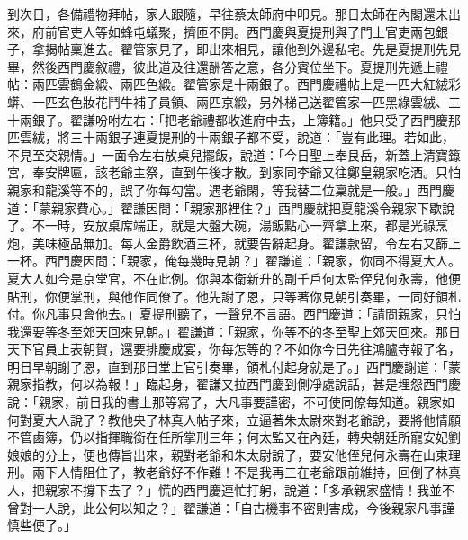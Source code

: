 到次日，各備禮物拜帖，家人跟隨，早往蔡太師府中叩見。那日太師在內閣還未出來，府前官吏人等如蜂屯蟻聚，擠匝不開。西門慶與夏提刑與了門上官吏兩包銀子，拿揭帖稟進去。翟管家見了，即出來相見，讓他到外邊私宅。先是夏提刑先見畢，然後西門慶敘禮，彼此道及往還酬答之意，各分賓位坐下。夏提刑先遞上禮帖：兩匹雲鶴金緞、兩匹色緞。翟管家是十兩銀子。西門慶禮帖上是一匹大紅絨彩蟒、一匹玄色妝花鬥牛補子員領、兩匹京緞，另外梯己送翟管家一匹黑綠雲絨、三十兩銀子。翟謙吩咐左右：「把老爺禮都收進府中去，上簿籍。」他只受了西門慶那匹雲絨，將三十兩銀子連夏提刑的十兩銀子都不受，說道：「豈有此理。若如此，不見至交親情。」一面令左右放桌兒擺飯，說道：「今日聖上奉艮岳，新蓋上清寶籙宮，奉安牌匾，該老爺主祭，直到午後才散。到家同李爺又往鄭皇親家吃酒。只怕親家和龍溪等不的，誤了你每勾當。遇老爺閑，等我替二位稟就是一般。」西門慶道：「蒙親家費心。」翟謙因問：「親家那裡住？」西門慶就把夏龍溪令親家下歇說了。不一時，安放桌席端正，就是大盤大碗，湯飯點心一齊拿上來，都是光祿烹炮，美味極品無加。每人金爵飲酒三杯，就要告辭起身。翟謙款留，令左右又篩上一杯。西門慶因問：「親家，俺每幾時見朝？」翟謙道：「親家，你同不得夏大人。夏大人如今是京堂官，不在此例。你與本衛新升的副千戶何太監侄兒何永壽，他便貼刑，你便掌刑，與他作同僚了。他先謝了恩，只等著你見朝引奏畢，一同好領札付。你凡事只會他去。」夏提刑聽了，一聲兒不言語。西門慶道：「請問親家，只怕我還要等冬至郊天回來見朝。」翟謙道：「親家，你等不的冬至聖上郊天回來。那日天下官員上表朝賀，還要排慶成宴，你每怎等的？不如你今日先往鴻臚寺報了名，明日早朝謝了恩，直到那日堂上官引奏畢，領札付起身就是了。」西門慶謝道：「蒙親家指教，何以為報！」臨起身，翟謙又拉西門慶到側凈處說話，甚是埋怨西門慶說：「親家，前日我的書上那等寫了，大凡事要謹密，不可使同僚每知道。親家如何對夏大人說了？教他央了林真人帖子來，立逼著朱太尉來對老爺說，要將他情願不管鹵簿，仍以指揮職銜在任所掌刑三年；何太監又在內廷，轉央朝廷所寵安妃劉娘娘的分上，便也傳旨出來，親對老爺和朱太尉說了，要安他侄兒何永壽在山東理刑。兩下人情阻住了，教老爺好不作難！不是我再三在老爺跟前維持，回倒了林真人，把親家不撐下去了？」慌的西門慶連忙打躬，說道：「多承親家盛情！我並不曾對一人說，此公何以知之？」翟謙道：「自古機事不密則害成，今後親家凡事謹慎些便了。」

